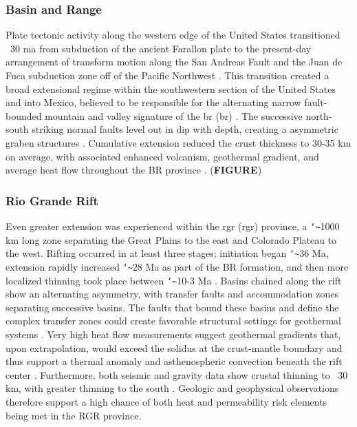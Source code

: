\subsubsection{Basin and Range}

Plate tectonic activity along the western edge of the United States transitioned ~30 \acrshort{ma} from subduction of the ancient Farallon plate to the present-day arrangement of transform motion along the San Andreas Fault and the Juan de Fuca subduction zone off of the Pacific Northwest \citep[~p. 81]{fowler_solid_2005}. This transition created a broad extensional regime within the southwestern section of the United States and into Mexico, believed to be responsible for the alternating narrow fault-bounded mountain and valley signature of the \acrlong{br} (\acrshort{br}) \citep{henry_real_1992}. The successive north-south striking normal faults level out in dip with depth, creating a asymmetric graben structures \citep[~p. 28-29]{frisch_continental_2011}. Cumulative extension reduced the crust thickness to 30-35 km on average, with associated enhanced volcanism, geothermal gradient, and average heat flow throughout the BR province \citep{lerch_crustal_2007}. (\textbf{FIGURE})

\subsubsection{Rio Grande Rift}

Even greater extension was experienced within the \acrlong{rgr} (\acrshort{rgr}) province, a \texttt{\char`\~}1000 km long zone separating the Great Plains to the east and Colorado Plateau to the west. Rifting occurred in at least three stages; initiation began \texttt{\char`\~}36 Ma, extension rapidly increased \texttt{\char`\~}28 Ma as part of the BR formation, and then more localized thinning took place between \texttt{\char`\~}10-3 Ma \citep{bielicki_hydrogeolgic_2015,mack_geology_2008,seager_new_1984}. Basins chained along the rift show an alternating asymmetry, with transfer faults and accommodation zones separating successive basins. The faults that bound these basins and define the complex transfer zones could create favorable structural settings for geothermal systems \citep{faulds_favorable_2015}. Very high heat flow measurements suggest geothermal gradients that, upon extrapolation, would exceed the solidus at the crust-mantle boundary and thus support a thermal anomaly and asthenospheric convection beneath the rift center \citep{olsen_rio_1987}. Furthermore, both seismic and gravity data show crustal thinning to ~30 km, with greater thinning to the south \citep{keller_rio_1999}. Geologic and geophysical observations therefore support a high chance of both heat and permeability risk elements being met in the RGR province. 


